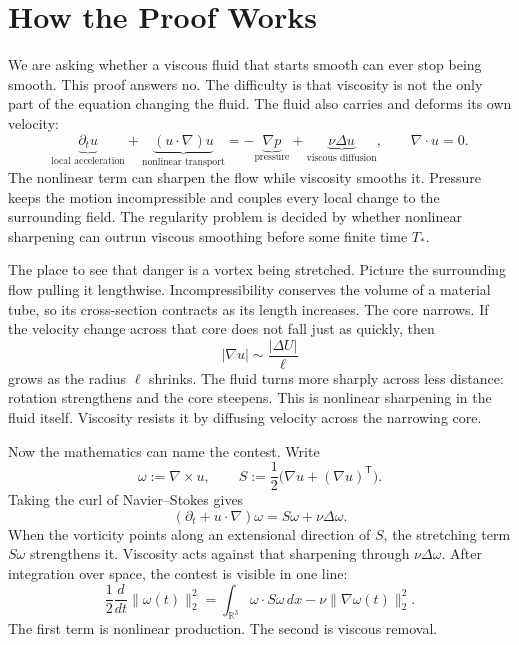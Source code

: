 \begingroup
\setlength{\parindent}{0pt}
\setlength{\parskip}{0.58\baselineskip}
\setlength{\abovedisplayskip}{9pt plus 2pt minus 2pt}
\setlength{\belowdisplayskip}{9pt plus 2pt minus 2pt}
\setlength{\jot}{7pt}

\section*{How the Proof Works}

We are asking whether a viscous fluid that starts smooth can ever stop being
smooth.  This proof answers no.  The difficulty is that viscosity is not the
only part of the equation changing the fluid.  The fluid also carries and
deforms its own velocity:
\[
\underbrace{\partial_tu}_{\text{local acceleration}}
+\underbrace{(u\!\cdot\nabla)u}_{\text{nonlinear transport}}
=-\underbrace{\nabla p}_{\text{pressure}}
+\underbrace{\nu\Delta u}_{\text{viscous diffusion}},
\qquad \nabla\!\cdot u=0.
\]
The nonlinear term can sharpen the flow while viscosity smooths it.  Pressure
keeps the motion incompressible and couples every local change to the
surrounding field.  The regularity problem is decided by whether nonlinear
sharpening can outrun viscous smoothing before some finite time \(T_*\).

The place to see that danger is a vortex being stretched.  Picture the
surrounding flow pulling it lengthwise.  Incompressibility conserves the volume
of a material tube, so its cross-section contracts as its length increases.
The core narrows.  If the velocity change across that core does not fall just
as quickly, then
\[
|\nabla u|\sim\frac{|\Delta U|}{\ell}
\]
grows as the radius \(\ell\) shrinks.  The fluid turns more sharply across
less distance: rotation strengthens and the core steepens.  This is nonlinear
sharpening in the fluid itself.  Viscosity resists it by diffusing velocity
across the narrowing core.

Now the mathematics can name the contest.  Write
\[
\omega:=\nabla\times u,
\qquad
S:=\frac12\bigl(\nabla u+(\nabla u)^{\mathsf T}\bigr).
\]
Taking the curl of Navier--Stokes gives
\[
(\partial_t+u\!\cdot\nabla)\omega
=S\omega+\nu\Delta\omega.
\]
When the vorticity points along an extensional direction of \(S\), the
stretching term \(S\omega\) strengthens it.  Viscosity acts against that
sharpening through \(\nu\Delta\omega\).  After integration over space, the
contest is visible in one line:
\[
\frac12\frac{d}{dt}\|\omega(t)\|_2^2
=\int_{\mathbb R^3}\omega\!\cdot S\omega\,dx
-\nu\|\nabla\omega(t)\|_2^2.
\]
The first term is nonlinear production.  The second is viscous removal.

